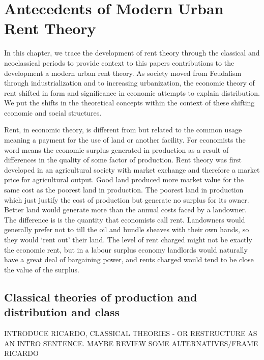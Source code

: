 \chapter{Antecedents of Modern Urban Rent Theory} \label{chapter-rent}

In this chapter, we trace the development of rent theory through the classical and neoclassical periods to provide context to this papers contributions to the development a modern urban rent theory. As society moved from Feudalism through industrialization and to increasing urbanization, the economic theory of rent shifted in form and significance in economic attempts to explain distribution. We put the shifts in the theoretical concepts within the context of these shifting economic and social structures. 



Rent, in economic theory, is different from but related to the common usage meaning a payment for the use of land or another facility.  For economists the word means the economic  surplus generated in production as a result of differences in the quality of some factor of production.  Rent theory was first developed in an agricultural society with market exchange and therefore a market price for agricultural output. Good land produced more market value for the same cost as the poorest land in production. The poorest land in production which just justify the cost of production but generate no surplus for its owner. Better land would generate more than the annual costs faced by a landowner. The difference is is the quantity that economists call rent. Landowners would generally prefer not to till the oil and bundle sheaves with their own hands, so they would `rent out' their land. The level of rent charged might not be exactly the economic rent, but in a labour surplus economy landlords would naturally have a great deal of bargaining power, and rents charged would tend to be close the value of the surplus. 


\section{Classical theories of production and distribution and class}
INTRODUCE RICARDO, CLASSICAL THEORIES - OR RESTRUCTURE AS AN INTRO SENTENCE.
MAYBE REVIEW SOME ALTERNATIVES/FRAME RICARDO

